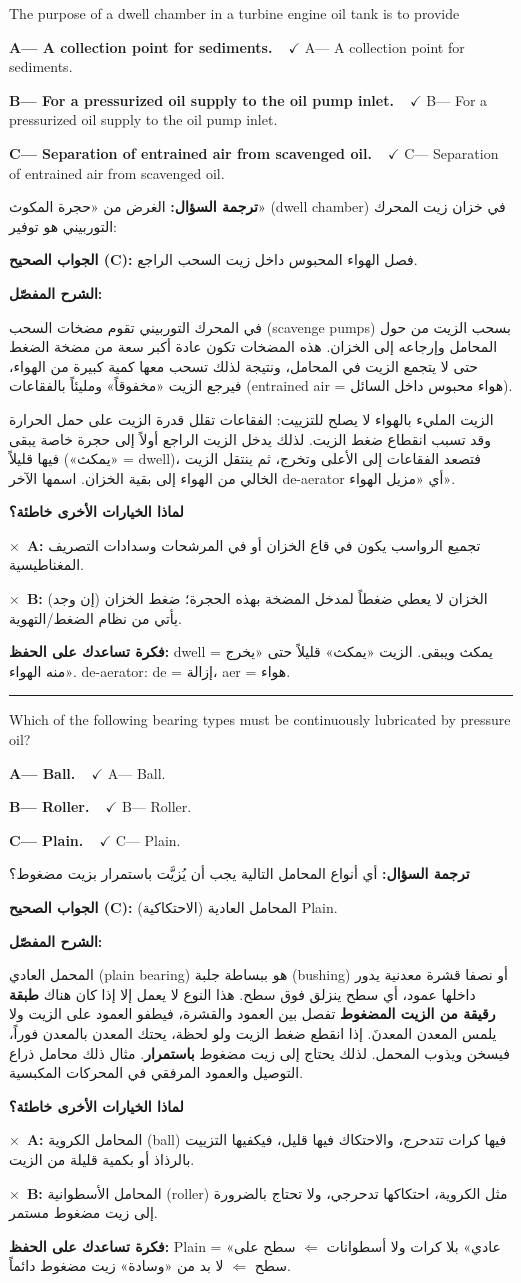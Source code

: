 \documentclass[11pt,a4paper]{article}
\newcommand{\en}[1]{\textenglish{#1}}
\newcommand{\correctletter}{}
\newcommand{\opt}[2]{%
  \ifdefstring{\correctletter}{#1}%
    {\textcolor{ansgreen}{\textbf{#1— #2\ \ $\checkmark$}}}%
    {#1— #2}\par}
\newcommand{\Q}[6]{%
  \renewcommand{\correctletter}{#6}%
  \par\bigskip
  \phantomsection\label{q#1}%
  \begin{tcolorbox}[enhanced,breakable,colback=qback,colframe=qframe,
      arc=2mm,boxrule=0.8pt,fonttitle=\bfseries,
      title={\en{Question #1}}]
    \begin{english}
      #2\par\smallskip
      \opt{A}{#3}\opt{B}{#4}\opt{C}{#5}
    \end{english}
  \end{tcolorbox}}
\newcommand{\tr}[1]{\textbf{\textcolor{qframe}{ترجمة السؤال:}} #1\par}
\newcommand{\ans}[2]{%
  \begin{tcolorbox}[colback=ansback,colframe=ansgreen,boxrule=0.6pt,arc=1.5mm,
      left=4pt,right=4pt,top=2pt,bottom=2pt]
    \textbf{\textcolor{ansgreen}{الجواب الصحيح (\en{#1}):}} #2
  \end{tcolorbox}}
\newcommand{\sharh}[1]{\textbf{\textcolor{conceptc}{الشرح المفصّل:}}\par #1\par}
\newcommand{\nohead}{\textbf{\textcolor{wrongc}{لماذا الخيارات الأخرى خاطئة؟}}\par}
\newcommand{\no}[2]{\hspace*{1em}\textcolor{wrongc}{$\times$}\ \textbf{\en{#1}:} #2\par}
\newcommand{\tip}[1]{%
  \begin{tcolorbox}[colback=tipback,colframe=tipframe,boxrule=0.5pt,arc=1.5mm,
      left=4pt,right=4pt,top=2pt,bottom=2pt]
    \textbf{فكرة تساعدك على الحفظ:} #1
  \end{tcolorbox}}
\newcommand{\qsep}{\par\medskip\noindent\textcolor{qframe!40}{\rule{\linewidth}{0.4pt}}\par}
\begin{document}
\Q{8501}{The purpose of a dwell chamber in a turbine engine oil tank is to provide}
{A collection point for sediments.}
{For a pressurized oil supply to the oil pump inlet.}
{Separation of entrained air from scavenged oil.}{C}
\tr{الغرض من «حجرة المكوث» (\en{dwell chamber}) في خزان زيت المحرك التوربيني هو توفير:}
\ans{C}{فصل الهواء المحبوس داخل زيت السحب الراجع.}
\sharh{في المحرك التوربيني تقوم مضخات السحب (\en{scavenge pumps}) بسحب الزيت من حول المحامل وإرجاعه إلى الخزان. هذه المضخات تكون عادة أكبر سعة من مضخة الضغط حتى لا يتجمع الزيت في المحامل، ونتيجة لذلك تسحب معها كمية كبيرة من الهواء، فيرجع الزيت «مخفوقاً» ومليئاً بالفقاعات (\en{entrained air} = هواء محبوس داخل السائل).

الزيت المليء بالهواء لا يصلح للتزييت: الفقاعات تقلل قدرة الزيت على حمل الحرارة وقد تسبب انقطاع ضغط الزيت. لذلك يدخل الزيت الراجع أولاً إلى حجرة خاصة يبقى فيها قليلاً («يمكث» = \en{dwell})، فتصعد الفقاعات إلى الأعلى وتخرج، ثم ينتقل الزيت الخالي من الهواء إلى بقية الخزان. اسمها الآخر \en{de-aerator} أي «مزيل الهواء».}
\nohead
\no{A}{تجميع الرواسب يكون في قاع الخزان أو في المرشحات وسدادات التصريف المغناطيسية.}
\no{B}{الخزان لا يعطي ضغطاً لمدخل المضخة بهذه الحجرة؛ ضغط الخزان (إن وجد) يأتي من نظام الضغط/التهوية.}
\tip{\en{dwell} = يمكث ويبقى. الزيت «يمكث» قليلاً حتى «يخرج منه الهواء». \en{de-aerator}: \en{de} = إزالة، \en{aer} = هواء.}
\qsep

\Q{8502}{Which of the following bearing types must be continuously lubricated by pressure oil?}
{Ball.}
{Roller.}
{Plain.}{C}
\tr{أي أنواع المحامل التالية يجب أن يُزيَّت باستمرار بزيت مضغوط؟}
\ans{C}{المحامل العادية (الاحتكاكية) \en{Plain}.}
\sharh{المحمل العادي (\en{plain bearing}) هو ببساطة جلبة (\en{bushing}) أو نصفا قشرة معدنية يدور داخلها عمود، أي سطح ينزلق فوق سطح. هذا النوع لا يعمل إلا إذا كان هناك \textbf{طبقة رقيقة من الزيت المضغوط} تفصل بين العمود والقشرة، فيطفو العمود على الزيت ولا يلمس المعدن المعدنَ. إذا انقطع ضغط الزيت ولو لحظة، يحتك المعدن بالمعدن فوراً، فيسخن ويذوب المحمل. لذلك يحتاج إلى زيت مضغوط \textbf{باستمرار}. مثال ذلك محامل ذراع التوصيل والعمود المرفقي في المحركات المكبسية.}
\nohead
\no{A}{المحامل الكروية (\en{ball}) فيها كرات تتدحرج، والاحتكاك فيها قليل، فيكفيها التزييت بالرذاذ أو بكمية قليلة من الزيت.}
\no{B}{المحامل الأسطوانية (\en{roller}) مثل الكروية، احتكاكها تدحرجي، ولا تحتاج بالضرورة إلى زيت مضغوط مستمر.}
\tip{\en{Plain} = «عادي» بلا كرات ولا أسطوانات $\Leftarrow$ سطح على سطح $\Leftarrow$ لا بد من «وسادة» زيت مضغوط دائماً.}

\newpage
\end{document}
